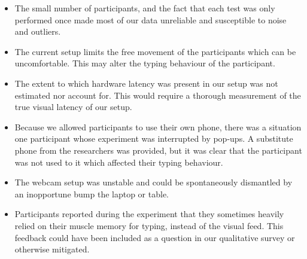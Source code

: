 \begin{itemize}
	\item The small number of participants, and the fact that each test was only 
	performed once made most of our data unreliable and susceptible to noise and outliers.
	\item The current setup limits the free movement of the participants which can be uncomfortable. This may alter the typing behaviour of the participant.
	\item The extent to which hardware latency was present in our setup was not estimated nor account for.
		This would require a thorough measurement of the true visual latency of our setup.
	\item Because we allowed participants to use their own phone, there was a situation 
		one participant whose experiment was interrupted by pop-ups.
		A substitute phone from the researchers was provided, but it was clear that the participant was not used 
		to it which affected their typing behaviour.

	\item The webcam setup was unstable and could be spontaneously dismantled by an inopportune bump the laptop or table.
	\item Participants reported during the experiment that they sometimes heavily relied on their muscle memory for typing,
		instead of the visual feed. This feedback could have been included as a question in our qualitative survey or otherwise mitigated.
\end{itemize}
